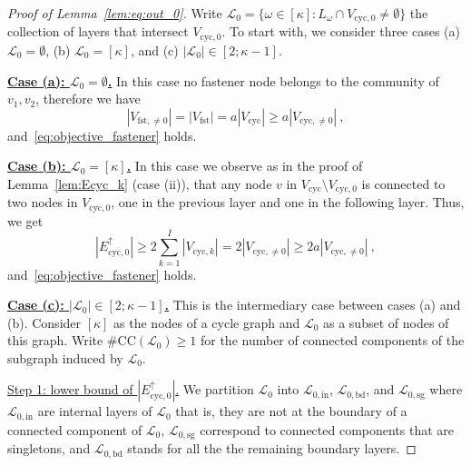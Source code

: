 \documentclass[final]{colt2026}
\newcommand{\1}{\mathbf{1}}
\begin{document}
\begin{proof}[Proof of Lemma~\ref{lem:eq:out_0}]


Write $\mathcal{L}_0= \{\omega\in [\kappa]: L_{\omega}\cap V_{\mathrm{cyc},0}\neq \emptyset\}$ the collection of layers that intersect $V_{\mathrm{cyc},0}$. To start with, we consider three cases (a) $\mathcal{L}_0=\emptyset$, (b) $\mathcal{L}_0=[\kappa]$, and (c) $|\mathcal{L}_0|\in [2;\kappa-1]$.

\noindent
\underline{\bf Case (a): $\mathcal{L}_0=\emptyset$.} In this case no fastener node belongs to the community of $v_1, v_2$, therefore we have 
\[
|V_{\mathrm{fst},\neq 0}|=  |V_{\mathrm{fst}}|= a |V_{\mathrm{cyc}}|\geq a  |V_{\mathrm{cyc},\neq 0}| \ , 
\]
and~\eqref{eq:objective_fastener} holds. 


\medskip 

\noindent
\underline{\bf Case (b): $\mathcal{L}_0=[\kappa]$.} In this case we observe as in the proof of Lemma~\ref{lem:Ecyc_k} (case (ii)), that any node $v$ in $V_{\mathrm{cyc}}\setminus V_{\mathrm{cyc},0}$ is connected to two nodes in $V_{\mathrm{cyc},0}$, one in the previous layer and one in the following layer. Thus, we get 
\[
|E_{\mathrm{cyc},0}^{\uparrow}|\geq 2 \sum_{k=1}^I |V_{\mathrm{cyc},k}| =  2|V_{\mathrm{cyc},\neq 0}| \geq 2a|V_{\mathrm{cyc},\neq 0}|\ , 
\]
and~\eqref{eq:objective_fastener} holds. 



\medskip 

\noindent
\underline{\bf Case (c): $|\mathcal{L}_0|\in [2;\kappa-1]$.} This is the intermediary case between cases (a) and (b). Consider $[\kappa]$ as the nodes of a cycle graph and $\mathcal{L}_0$ as a subset of nodes of this graph. Write $\#\mathrm{CC}(\mathcal L_0)\geq 1$ for the number of connected components of the subgraph induced by $\mathcal{L}_0$. 
\smallskip

\noindent
\underline{Step 1: lower bound of $|E_{\mathrm{cyc},0}^{\uparrow}|$.} We partition $\mathcal{L}_0$ into $\mathcal{L}_{0,\mathrm{in}}$, $\mathcal{L}_{0,\mathrm{bd}}$, and $\mathcal{L}_{0,\mathrm{sg}}$ where $\mathcal{L}_{0,\mathrm{in}}$ are internal layers of $\mathcal{L}_0$ that is, they are not at the boundary of a connected component of $\mathcal{L}_0$, $\mathcal{L}_{0,\mathrm{sg}}$ correspond to connected components that are singletons, and $\mathcal{L}_{0,\mathrm{bd}}$ stands for all the the remaining boundary layers. 


\end{proof}
\end{document}

